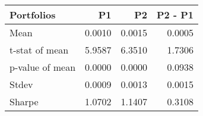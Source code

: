 \begin{tabular}{lrrr}
\toprule
Portfolios & P1 & P2 & P2 - P1 \\
\midrule
Mean & 0.0010 & 0.0015 & 0.0005 \\
t-stat of mean & 5.9587 & 6.3510 & 1.7306 \\
p-value of mean & 0.0000 & 0.0000 & 0.0938 \\
Stdev & 0.0009 & 0.0013 & 0.0015 \\
Sharpe & 1.0702 & 1.1407 & 0.3108 \\
\bottomrule
\end{tabular}
